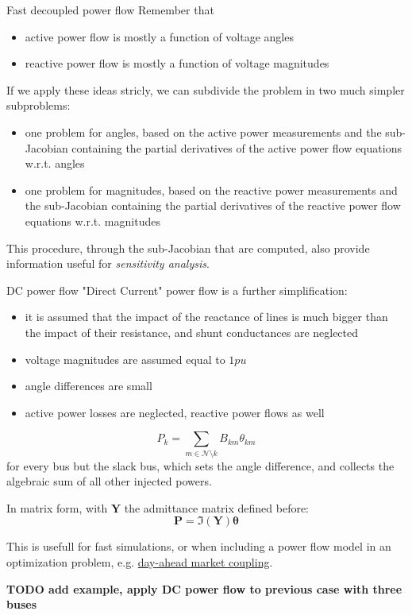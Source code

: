 \begin{frame}[allowframebreaks]{Fast decoupled power flow}
    Remember that
    \begin{itemize}
        \item active power flow is mostly a function of voltage angles
        \item reactive power flow is mostly a function of voltage magnitudes
    \end{itemize}
    
    If we apply these ideas stricly, we can subdivide the problem in two much simpler subproblems:
    \begin{itemize}
        \item one problem for angles, based on the active power measurements and the sub-Jacobian containing the partial derivatives of the active power flow equations w.r.t. angles
        \item one problem for magnitudes, based on the reactive power measurements and the sub-Jacobian containing the partial derivatives of the reactive power flow equations w.r.t. magnitudes
    \end{itemize}
    
    This procedure, through the sub-Jacobian that are computed, also provide information useful for \textit{sensitivity analysis}.
\end{frame}

\begin{frame}[allowframebreaks]{DC power flow}
    "Direct Current" power flow is a further simplification:
    \begin{itemize}
        \item it is assumed that the impact of the reactance of lines is much bigger than the impact of their resistance, and shunt conductances are neglected
        \item voltage magnitudes are assumed equal to $1 pu$
        \item angle differences are small
        \item active power losses are neglected, reactive power flows as well
    \end{itemize}
    
    $$P_k =  \sum_{m \in \mathcal{N} \setminus k} B_{km} \theta_{km}$$
    for every bus but the slack bus, which sets the angle difference, and collects the algebraic sum of all other injected powers.
    
    In matrix form, with $\mathbf{Y}$ the admittance matrix defined before:
    $$\mathbf{P} =  \Im(\mathbf{Y}) \mathbf{\theta}$$
    
    This is usefull for fast simulations, or when including a power flow model in an optimization problem, e.g. \href{https://bcornelusse.github.io/material/CoursEM20170331.pdf}{day-ahead market coupling}.

    \textbf{TODO add example, apply DC power flow to previous case with three buses}
\end{frame}


